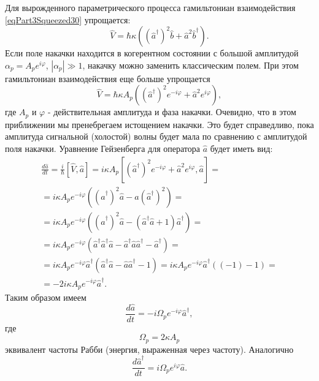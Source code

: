 Для вырожденного параметрического процесса гамильтониан взаимодействия
\eqref{eqPart3Squeezed30} упрощается:
\begin{equation}
\hat{V} = \hbar \kappa \left(
\left(\hat{a}^{\dag}\right)^2 \hat{b} + 
\hat{a}^2 \hat{b}^{\dag}
\right).
\nonumber
\end{equation}
Если поле накачки находится в когерентном состоянии с большой
амплитудой $\alpha_p = A_p e^{i \varphi}$, $\left|\alpha_p\right| \gg
1$, накачку можно заменить классическим полем. При этом гамильтониан
взаимодействия еще больше упрощается
\begin{equation}
\hat{V} = \hbar \kappa A_p\left(
\left(\hat{a}^{\dag}\right)^2 e^{- i \varphi} + 
\hat{a}^2 e^{i \varphi}
\right),
\nonumber
\end{equation}
где $A_p$ и $\varphi$ - действительная амплитуда и фаза
накачки. Очевидно, что в этом приближении мы пренебрегаем истощением
накачки. Это будет справедливо, пока амплитуда сигнальной (холостой)
волны будет мала по сравнению с амплитудой поля накачки. Уравнение
Гейзенберга для оператора $\hat{a}$ будет иметь вид:
\begin{eqnarray}
\frac{d\hat{a}}{dt} = \frac{i}{\hbar}
\left[\hat{V}, \hat{a}\right] = i \kappa A_p
\left[
\left(\hat{a}^{\dag}\right)^2 e^{- i \varphi} + 
\hat{a}^2 e^{i \varphi},
\hat{a}
\right] = 
\nonumber \\
=
i \kappa A_p e^{- i \varphi}
\left(
\left(
\hat{a}^{\dag}\right)^2  \hat{a} -
\hat{a}
\left(
\hat{a}^{\dag}\right)^2
\right) = 
\nonumber \\
=
i \kappa A_p e^{- i \varphi}
\left(
\left(
\hat{a}^{\dag}\right)^2  \hat{a} -
\left(\hat{a}^{\dag}\hat{a} + 1\right)
\hat{a}^{\dag}
\right) = 
\nonumber \\
=
i \kappa A_p e^{- i \varphi}
\left(
\hat{a}^{\dag}\hat{a}^{\dag}  \hat{a} -
\hat{a}^{\dag}\hat{a}\hat{a}^{\dag} -
\hat{a}^{\dag}
\right) = 
\nonumber \\
=
i \kappa A_p e^{- i \varphi}
\hat{a}^{\dag}
\left(
\hat{a}^{\dag}  \hat{a} -
\hat{a}\hat{a}^{\dag} -
1
\right) = 
i \kappa A_p e^{- i \varphi}
\hat{a}^{\dag}
\left(
\left(-1\right) -
1
\right) =
\nonumber \\
= 
- 2 i \kappa A_p e^{- i \varphi}
\hat{a}^{\dag}.
\nonumber
\end{eqnarray}
Таким образом имеем
\begin{equation}
\frac{d\hat{a}}{dt} = 
- i \Omega_p e^{- i \varphi}
\hat{a}^{\dag},
\label{eqPart3Squeezed34a}
\end{equation}
где 
\[
\Omega_p = 2 \kappa A_p
\]
эквивалент частоты Рабби (энергия, выраженная через частоту).
Аналогично
\begin{equation}
\frac{d\hat{a}^{\dag}}{dt} = 
i \Omega_p e^{i \varphi}
\hat{a}.
\label{eqPart3Squeezed34b}
\end{equation}

